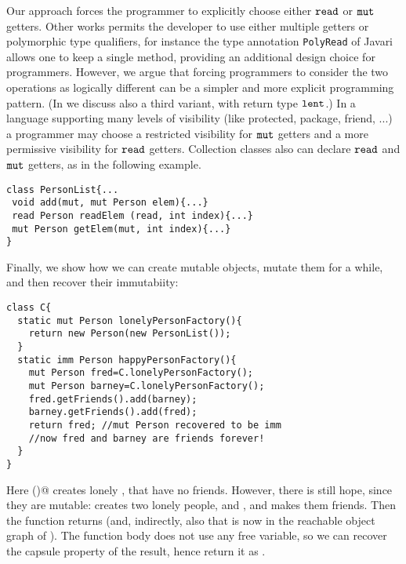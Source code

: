 {Our approach forces the programmer to explicitly choose either $\texttt{read}$ or $\texttt{mut}$ getters.}
Other works permits the developer to use
either multiple getters or polymorphic type qualifiers, for instance
the type annotation \lstinline{PolyRead} of Javari~\cite{TschantzErnst05} allows one
to keep a single method, providing an additional design choice for programmers.
However, we argue that forcing programmers to consider the two operations as logically different  can be a 
simpler and more explicit programming pattern.
 (In  we discuss also a third variant, with return type $\texttt{lent}$.)
In a language supporting many levels of visibility (like protected, package, friend, ...) a programmer may choose a restricted visibility for $\texttt{mut}$ getters and a more permissive visibility for $\texttt{read}$ getters.
Collection classes also can declare $\texttt{read}$ and $\texttt{mut}$ getters, as in the following example.
\begin{lstlisting}
class PersonList{...
 void add(mut, mut Person elem){...}
 read Person readElem (read, int index){...}
 mut Person getElem(mut, int index){...}
}
\end{lstlisting}
Finally, we show how we can create mutable objects, mutate them for a while, and then {recover their immutabiity}:
\begin{lstlisting}
class C{
  static mut Person lonelyPersonFactory(){
    return new Person(new PersonList());
  }
  static imm Person happyPersonFactory(){
    mut Person fred=C.lonelyPersonFactory();
    mut Person barney=C.lonelyPersonFactory();
    fred.getFriends().add(barney);
    barney.getFriends().add(fred);
    return fred; //mut Person recovered to be imm 
    //now fred and barney are friends forever!
  }
}
\end{lstlisting}
Here \Q@lonelyPersonFactory()@  creates lonely \Q@Person@s, that have no friends.
However, there is still hope, since they are mutable:
\Q@happyPersonFactory@ creates two lonely people, \Q@fred@ and \Q@barney@, and makes them friends.
Then the function returns \Q@fred@ (and, indirectly, also \Q@barney@ that is now in the reachable object graph of \Q@fred@).
The function body does not use any free variable, so we can {recover the capsule property of} the result, hence return it as \Q@imm@.

